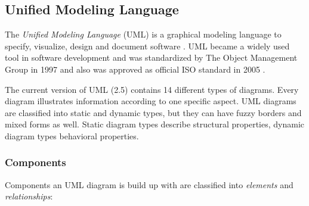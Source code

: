 \documentclass[twoside, openright, 12pt]{book}
\begin{document}
\subsection{Unified Modeling Language}
\label{UML}
The \textit{Unified Modeling Language} (UML) is a graphical modeling language to specify, visualize, design and document software \citep{UML_OMG}.
UML became a widely used tool in software development and was standardized by The Object Management Group in 1997 and also was approved as official ISO standard in 2005 \citep{UML_ISO}.

The current version of UML (2.5) contains 14 different types of diagrams.
Every diagram illustrates information according to one specific aspect.
UML diagrams are classified into static and dynamic types, but they can have fuzzy borders and mixed forms as well.
Static diagram types describe structural properties, dynamic diagram types behavioral properties.



\subsubsection{Components}
Components an UML diagram is build up with are classified into \textit{elements} and \textit{relationships}:
\end{document}
